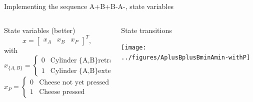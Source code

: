 \documentclass[presentation,aspectratio=1610]{beamer}
\begin{document}
\begin{frame}[label={sec:org078e432}]{Implementing the sequence A+B+B-A-, state variables}
\begin{columns}
\begin{column}{0.5\columnwidth}
\begin{block}{State variables (better)}
\[ x = \begin{bmatrix} x_A & x_B & x_P\end{bmatrix}^T, \]
with
\[ x_{\{A,B\}} = \begin{cases} 0 & \text{Cylinder \{A,B\} retracted}\\
                               1& \text{Cylinder \{A,B\} extended}
                 \end{cases}
   \]
\[ x_{P} = \begin{cases} 0 & \text{Cheese not yet pressed}\\
                               1& \text{Cheese pressed}
                 \end{cases}
   \]
\end{block}
\end{column}

\begin{column}{0.5\columnwidth}
\begin{block}{State transitions}
\begin{center}
\texttt{[image: ../figures/AplusBplusBminAmin-withP]}
\end{center}
\end{block}
\end{column}
\end{columns}
\end{frame}
\end{document}

